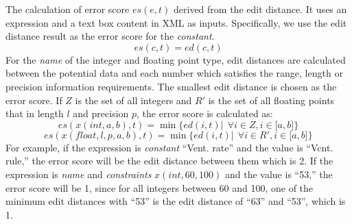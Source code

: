 The calculation of error score $es(e, t)$ derived from the edit 
distance. It uses an expression and a text box content in XML as inputs. 
Specifically, we use the edit distance result as 
the error score for the {\em constant}. 
\begin{equation}
es(c, t) = ed(c, t)
\end{equation}
For the {\em name} of the integer and floating point type, 
edit distances are calculated between the potential data and each number 
which satisfies the range, length or precision information requirements. 
The smallest edit distance is chosen as the error score. 
If $Z$ is the set of all integers and $R'$ is the set of 
all floating points that in length $l$ and precision $p$, 
the error score is calculated as: 
\begin{equation}
es(x(int, a, b), t)=\min\{ed(i, t)| ~~\forall i \in Z, i \in \lbrack a, b \rbrack\}
\end{equation}
\begin{equation}
es(x(float, l, p, a, b), t)=\min\{ed(i, t)| ~~\forall i \in R', i \in \lbrack a, b \rbrack\}
\end{equation}
For example, if the expression is {\em constant} ``Vent. rate'' and 
the value is ``Vcnt. rule,''
the error score will be the edit distance between them which is 2. 
If the expression is {\em name} and {\em constraints} $x(int, 60, 100)$ 
and the value is ``53,'' the error score will be 1, since for all integers 
between 60 and 100, one of the minimum edit distances with ``53'' is 
the edit distance of ``63'' and ``53'', which is 1. 

